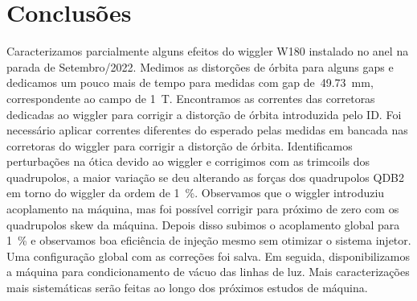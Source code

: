 \documentclass[a4paper,
               keeplastbox,   %
               ]{jacow}
\begin{document}
\section{Conclusões}
Caracterizamos parcialmente alguns efeitos do wiggler W180 instalado no anel na parada de Setembro/2022. Medimos as distorções de órbita para alguns gaps e dedicamos um pouco mais de tempo para medidas com gap de~\SI{49.73}{\milli\meter}, correspondente ao campo de \SI{1}{\tesla}. Encontramos as correntes das corretoras dedicadas ao wiggler para corrigir a distorção de órbita introduzida pelo ID. Foi necessário aplicar correntes diferentes do esperado pelas medidas em bancada nas corretoras do wiggler para corrigir a distorção de órbita. Identificamos perturbações na ótica devido ao wiggler e corrigimos com as trimcoils dos quadrupolos, a maior variação se deu alterando as forças dos quadrupolos QDB2 em torno do wiggler da ordem de \SI{1}{\percent}. Observamos que o wiggler introduziu acoplamento na máquina, mas foi possível corrigir para próximo de zero com os quadrupolos skew da máquina. Depois disso subimos o acoplamento global para \SI{1}{\percent} e observamos boa eficiência de injeção mesmo sem otimizar o sistema injetor. Uma configuração global com as correções foi salva. Em seguida, disponibilizamos a máquina para condicionamento de vácuo das linhas de luz. Mais caracterizações mais sistemáticas serão feitas ao longo dos próximos estudos de máquina.
\end{document}
